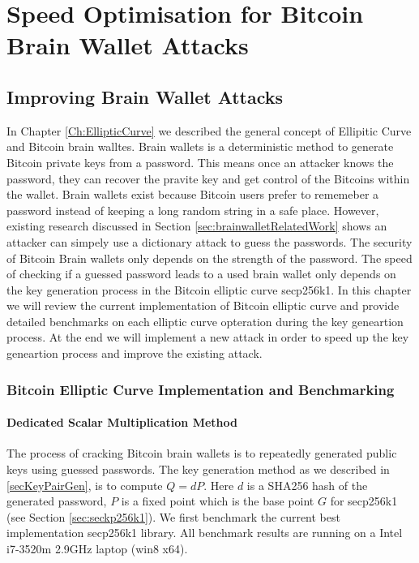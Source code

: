 \part{Speed Optimisation for Bitcoin Brain Wallet Attacks}


\chapter{Improving Brain Wallet Attacks}
In Chapter \ref{Ch:EllipticCurve} we described the general concept of Ellipitic Curve and Bitcoin brain walltes. Brain wallets is a deterministic method to generate Bitcoin private keys from a password. This means once an attacker knows the password, they can recover the pravite key and get control of the Bitcoins within the wallet. Brain wallets exist because Bitcoin users prefer  to rememeber a password instead of keeping a long random string in a safe place. However, existing research discussed in Section \ref{sec:brainwalletRelatedWork} shows an attacker can simpely use a dictionary attack to guess the passwords. The security of Bitcoin Brain wallets only depends on the strength of the password. The  speed of checking if a guessed password leads to a used brain wallet only depends on the key generation process in the Bitcoin elliptic curve secp256k1. In this chapter we will review the current implementation of Bitcoin elliptic curve and provide detailed benchmarks on each elliptic curve opteration during the key geneartion process. At the end we will implement a new attack in order to speed up the key geneartion process and improve the existing attack.
\section{Bitcoin Elliptic Curve Implementation and Benchmarking}
\subsection{Dedicated Scalar Multiplication Method} \label {sec:specialMethod}
The process of cracking Bitcoin brain wallets is to repeatedly generated public keys using guessed passwords. The key generation method as we described in \ref{secKeyPairGen}, is to compute $Q = dP$. Here $d$ is a SHA256 hash of the generated password, $P$ is a fixed point which is the base point $G$ for secp256k1 (see Section \ref{sec:seckp256k1}). We first benchmark the current best implementation secp256k1 library. All benchmark results are running on a Intel i7-3520m 2.9GHz laptop (win8 x64).

